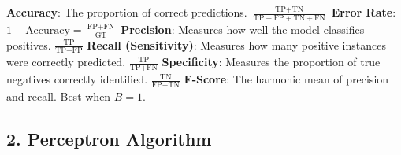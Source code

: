 \begin{outline}
    \1 \textbf{Accuracy}: The proportion of correct predictions. \(\frac{\text{TP} + \text{TN}}{\text{TP} + \text{FP} + \text{TN} + \text{FN}}\)
    \1 \textbf{Error Rate}: \(1 - \text{Accuracy} = \frac{\text{FP} + \text{FN}}{\text{GT}}\)
    \1 \textbf{Precision}: Measures how well the model classifies positives. \(\frac{\text{TP}}{\text{TP} + \text{FP}}\)
    \1 \textbf{Recall (Sensitivity)}: Measures how many positive instances were correctly predicted. \(\frac{\text{TP}}{\text{TP} + \text{FN}}\)
    \1 \textbf{Specificity}: Measures the proportion of true negatives correctly identified. \(\frac{\text{TN}}{\text{FP} + \text{TN}}\)
    \1 \textbf{F-Score}: The harmonic mean of precision and recall. Best when \(B = 1\).
\end{outline}

\subsection*{2. Perceptron Algorithm}

